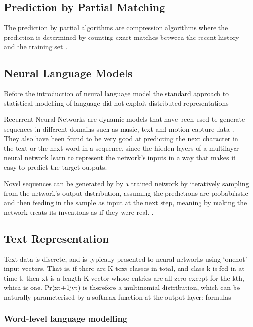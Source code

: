 \subsection{Prediction by Partial Matching}
The prediction by partial algorithms are compression algorithms where the prediction is determined by counting exact matches between the recent history and the training set \cite{graves2013generating}.
    
\subsection{Neural Language Models}
Before the introduction of neural language model the standard approach to statistical modelling of language did not exploit distributed representations\cite{lecun2015deep}

Recurrent Neural Networks are dynamic models that have been used to generate sequences in different domains such as music, text and motion capture data \cite{graves2013generating}.
They also have been found to be very good at predicting the next character in the text or the next word in a sequence, since the hidden layers of a multilayer neural network learn to represent the network’s inputs in a way that makes it easy to predict the target outputs.\cite{lecun2015deep}

Novel sequences can be generated by by a trained network by iteratively sampling from the network's output distribution, assuming the predictions are probabilistic and then feeding in the sample as input at the next step, meaning by making the network treats its inventions as if they were real. 
\cite{graves2013generating}.


\subsection{Text Representation}
Text data is discrete, and is typically presented to neural networks using `onehot' input vectors. That is, if there are K text classes in total, and class k is fed in at time t, then xt is a length K vector whose entries are all zero except for the kth, which is one. Pr(xt+1jyt) is therefore a multinomial distribution, which can be naturally parameterised by a softmax function at the output layer:
formulas

\subsubsection{Word-level language modelling}

